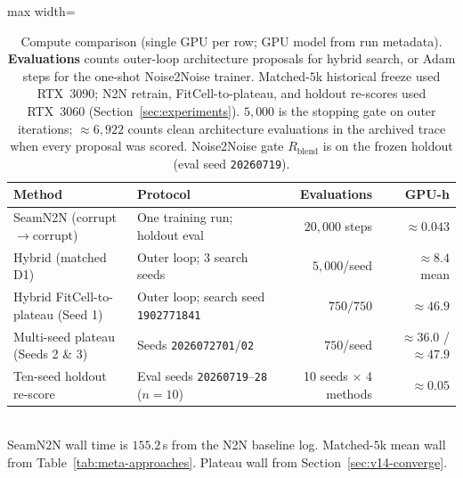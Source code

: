 \begin{table}[t]
  \centering
  \caption{Compute comparison (single GPU per row; GPU model from run metadata).
    \textbf{Evaluations} counts outer-loop architecture proposals for hybrid search, or Adam steps for the one-shot Noise2Noise trainer.
    Matched-$5$k historical freeze used RTX~3090; N2N retrain, FitCell-to-plateau, and holdout re-scores used RTX~3060 (Section~\ref{sec:experiments}).
    $5{,}000$ is the stopping gate on outer iterations; $\approx 6{,}922$ counts clean architecture evaluations in the archived trace when every proposal was scored.
    Noise2Noise gate $R_{\mathrm{blend}}$ is on the frozen holdout (eval seed \texttt{20260719}).}
  \label{tab:compute-n2n-hybrid}
  \setlength{\tabcolsep}{3pt}
  \footnotesize
  \begin{adjustbox}{max width=\columnwidth}
  \begin{tabular}{@{}lp{}rr@{}}
    \toprule
    Method & Protocol & Evaluations & GPU-h \\
    \midrule
    SeamN2N (corrupt$\to$corrupt) & One training run; holdout eval & $20{,}000$ steps & ${\approx}0.043$ \\
    Hybrid (matched D1) & Outer loop; 3 search seeds & $5{,}000$/seed & ${\approx}8.4$ mean \\
    Hybrid FitCell-to-plateau (Seed 1) & Outer loop; search seed \texttt{1902771841} & $750/750$ & ${\approx}46.9$ \\
    Multi-seed plateau (Seeds 2 \& 3) & Seeds \texttt{2026072701}/\texttt{02} & $750$/seed & ${\approx}36.0$ / ${\approx}47.9$ \\
    Ten-seed holdout re-score & Eval seeds \texttt{20260719}--\texttt{28} ($n{=}10$) & 10 seeds $\times$ 4 methods & ${\approx}0.05$ \\
    \bottomrule
  \end{tabular}
  \end{adjustbox}\\[0.35em]
  {\footnotesize SeamN2N wall time is $155.2$\,s from the N2N baseline log.
  Matched-$5$k mean wall from Table~\ref{tab:meta-approaches}.
  Plateau wall from Section~\ref{sec:v14-converge}.}
\end{table}
